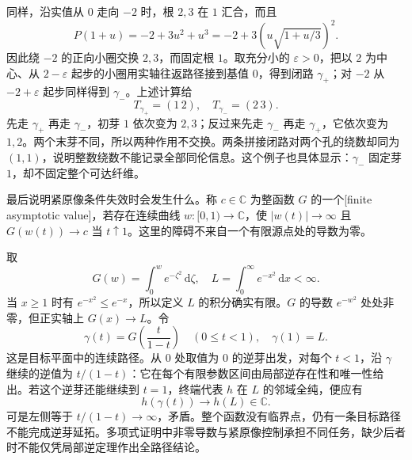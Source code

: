 \ProseParagraphBreak
同样，沿实值从 \(0\) 走向 \(-2\) 时，根 \(2,3\) 在 \(1\) 汇合，而且
\[
 P(1+u)=-2+3u^2+u^3
 =-2+3\left(u\sqrt{1+u/3}\right)^2.
\]
因此绕 \(-2\) 的正向小圈交换 \(2,3\)，而固定根 \(1\)。取充分小的 \(\varepsilon>0\)，把以 \(2\) 为中心、从 \(2-\varepsilon\) 起步的小圈用实轴往返路径接到基值 \(0\)，得到闭路 \(\gamma_+\)；对 \(-2\) 从 \(-2+\varepsilon\) 起步同样得到 \(\gamma_-\)。上述计算给
\[
 T_{\gamma_+}=(1\,2),\quad T_{\gamma_-}=(2\,3).
\]
先走 \(\gamma_+\) 再走 \(\gamma_-\)，初芽 \(1\) 依次变为 \(2,3\)；反过来先走 \(\gamma_-\) 再走 \(\gamma_+\)，它依次变为 \(1,2\)。两个末芽不同，所以两种作用不交换。两条拼接闭路对两个孔的绕数却同为 \((1,1)\)，说明整数绕数不能记录全部同伦信息。这个例子也具体显示：\(\gamma_-\) 固定芽 \(1\)，却不固定整个可达纤维。

\ProseParagraphBreak
最后说明紧原像条件失效时会发生什么。称 \(c\in\mathbb C\) 为整函数 \(G\) 的一个[finite asymptotic value]，若存在连续曲线 \(w:[0,1)\rightarrow\mathbb C\)，使 \(|w(t)|\rightarrow\infty\) 且 \(G(w(t))\rightarrow c\) 当 \(t\uparrow1\)。这里的障碍不来自一个有限源点处的导数为零。

\ProseParagraphBreak
取
\[
 G(w)=\int_0^w e^{-\zeta^2}\,\mathrm d\zeta,\quad
 L=\int_0^\infty e^{-x^2}\,\mathrm dx<\infty.
\]
当 \(x\ge1\) 时有 \(e^{-x^2}\le e^{-x}\)，所以定义 \(L\) 的积分确实有限。\(G\) 的导数 \(e^{-w^2}\) 处处非零，但正实轴上 \(G(x)\rightarrow L\)。令
\[
 \gamma(t)=G\left(\frac{t}{1-t}\right)\quad(0\le t<1),
 \quad\gamma(1)=L.
\]
这是目标平面中的连续路径。从 \(0\) 处取值为 \(0\) 的逆芽出发，对每个 \(t<1\)，沿 \(\gamma\) 继续的逆值为 \(t/(1-t)\)：它在每个有限参数区间由局部逆存在性和唯一性给出。若这个逆芽还能继续到 \(t=1\)，终端代表 \(h\) 在 \(L\) 的邻域全纯，便应有
\[
 h(\gamma(t))\longrightarrow h(L)\in\mathbb C.
\]
可是左侧等于 \(t/(1-t)\rightarrow\infty\)，矛盾。整个函数没有临界点，仍有一条目标路径不能完成逆芽延拓。多项式证明中非零导数与紧原像控制承担不同任务，缺少后者时不能仅凭局部逆定理作出全路径结论。
